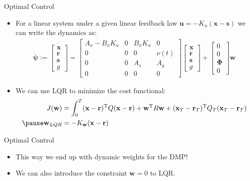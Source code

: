 \documentclass{beamer}
\newcommand{\fullvec}{\boldsymbol{\psi}} %
\newcommand{\basis}{\mathbf{\Phi}} %
\newcommand{\state}{\mathbf{x}} %
\newcommand{\traj}{\mathbf{r}} %
\newcommand{\dmp}{\mathbf{s}} %
\newcommand{\sysInput}{\mathbf{u}} %
\newcommand{\weights}{\mathbf{w}} %
\begin{document}
\begin{frame}{Optimal Control}
\begin{itemize}
\item For a linear system under a given linear feedback law $\sysInput = -K_u(\state - \dmp)$ we can write the dynamics as: \pause
\begin{equation*}
\begin{aligned}
 \dot{\fullvec} := \dot{
 \begin{bmatrix}
  \state \\
  \traj \\
  \dmp \\
  g
 \end{bmatrix}} = 
 \begin{bmatrix}
  A_x - B_xK_u & 0 & B_xK_u & 0 \\
  0 & 0 & 0 & \nu(t) \\
  0  & 0  & A_s & A_g  \\
  0 & 0 & 0 & 0
 \end{bmatrix}
 \begin{bmatrix}
   \state \\
   \traj \\
   \dmp \\
   g
  \end{bmatrix} +
  \begin{bmatrix}
    0 \\
    0 \\
    \basis \\
    0
   \end{bmatrix} \weights
\end{aligned}
\end{equation*}
\pause
\item We can use LQR to minimize the cost functional: \pause
\begin{equation*}
\begin{aligned}
J(\weights) &= \int_{0}^{T} (\state - \traj)^{\mathrm{T}}Q(\state - \traj) + \weights^{\mathrm{T}}R\weights + (\state_T-\traj_T)^{\mathrm{T}}Q_{T}(\state_T-\traj_T) \\ \pause
\weights_{LQR} &= -K_{\weights}(\state - \traj)
\end{aligned}
\end{equation*}
\end{itemize}
\end{frame}
%
\begin{frame}{Optimal Control}
\begin{itemize}
\item This way we end up with dynamic weights for the DMP! \pause
\item We can also introduce the constraint $\dot{\weights} = 0$ to LQR.
\end{itemize}
\end{frame}	
\end{document}
